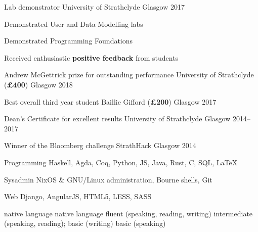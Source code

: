 \documentclass[11pt, a4paper]{awesome-cv}
\begin{document}
\begin{cventries}
    \cventry
      {Lab demonstrator} %
      {University of Strathclyde} %
      {Glasgow} %
      {2017} %
      {
        \begin{cvitems} %
          \item {Demonstrated User and Data Modelling labs}
          \item {Demonstrated Programming Foundations}
          \item {Received enthusiastic \textbf{positive feedback} from students}
        \end{cvitems}
      }

\end{cventries}

\newpage


\begin{cvhonors}
  
    \cvhonor
      {Andrew McGettrick prize for outstanding performance } %
      {University of Strathclyde (\textbf{£400})} %
      {Glasgow} %
      {2018} %
  
    \cvhonor
      {Best overall third year student} %
      {Baillie Gifford (\textbf{£200})} %
      {Glasgow} %
      {2017} %
  
    \cvhonor
      {Dean's Certificate for excellent results} %
      {University of Strathclyde} %
      {Glasgow} %
      {2014--2017} %
  
    \cvhonor
      {Winner of the Bloomberg challenge} %
      {StrathHack} %
      {Glasgow} %
      {2014} %
\end{cvhonors}

\noindent
\begin{minipage}[t]{0.55\linewidth}

\begin{cvskills}
    \cvskill
      {Programming} %
      {Haskell, Agda, Coq, Python, JS, Java, Rust, C, SQL, LaTeX} %
  
    \cvskill
      {Sysadmin} %
      {NixOS \& GNU/Linux administration, Bourne shells, Git} %
  
    \cvskill
      {Web} %
      {Django, AngularJS, HTML5, LESS, SASS} %
\end{cvskills}
\end{minipage}%
\hspace{0.05\linewidth}
\begin{minipage}[t]{0.4\linewidth}

\begin{cvskills}
     {native language}
     {native language}
     {fluent (speaking, reading, writing)}
     {
        intermediate (speaking, reading);\newline
        basic (writing)}
     {basic (speaking)}
\end{cvskills}
\end{minipage}
\end{document}
